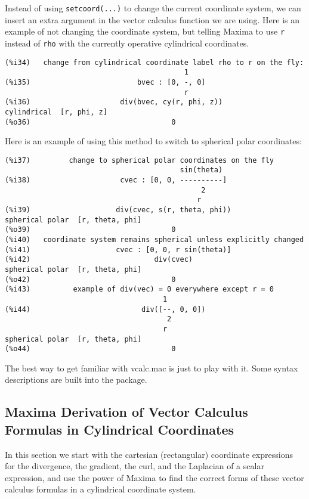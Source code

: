 \documentclass[12pt]{article}
\begin{document}
\normalsize
Instead of using \verb|setcoord(...)| to change the current coordinate system,
  we can insert an extra argument in the vector calculus function we are using.
Here is an example of not changing the coordinate system, but telling Maxima to
  use \verb|r| instead of \verb|rho| with the currently operative cylindrical
  coordinates.
\small
\begin{verbatim}
(%i34)   change from cylindrical coordinate label rho to r on the fly: 
                                          1
(%i35)                         bvec : [0, -, 0]
                                          r
(%i36)                     div(bvec, cy(r, phi, z))
cylindrical  [r, phi, z] 
(%o36)                                 0
\end{verbatim}
\normalsize
Here is an example of using this method to switch to spherical polar
  coordinates:
\small
\begin{verbatim}
(%i37)         change to spherical polar coordinates on the fly 
                                         sin(theta)
(%i38)                     cvec : [0, 0, ----------]
                                              2
                                             r
(%i39)                    div(cvec, s(r, theta, phi))
spherical polar  [r, theta, phi] 
(%o39)                                 0
(%i40)   coordinate system remains spherical unless explicitly changed 
(%i41)                    cvec : [0, 0, r sin(theta)]
(%i42)                             div(cvec)
spherical polar  [r, theta, phi] 
(%o42)                                 0
(%i43)          example of div(vec) = 0 everywhere except r = 0 
                                     1
(%i44)                          div([--, 0, 0])
                                      2
                                     r
spherical polar  [r, theta, phi] 
(%o44)                                 0
\end{verbatim}
\normalsize
The best way to get familiar with vcalc.mac is just to play with it.
Some syntax descriptions are built into the package.
  
\subsection{Maxima Derivation of Vector Calculus Formulas in Cylindrical Coordinates   }
In this section we start with the cartesian (rectangular) coordinate expressions for the
  divergence, the gradient, the curl, and the Laplacian of a scalar expression, and
  use the power of Maxima to find the correct forms of these vector calculus formulas
  in a cylindrical coordinate system.
  
\end{document}
